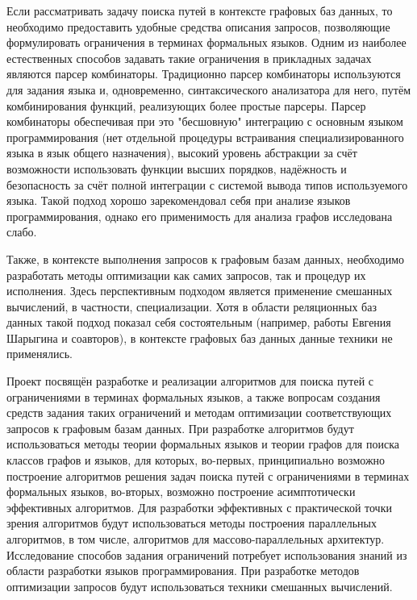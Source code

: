 \documentclass[12pt]{article}  %
\theoremstyle{remark}
\begin{document}
Если рассматривать задачу поиска путей в контексте графовых баз данных, то необходимо предоставить удобные средства описания запросов, позволяющие формулировать ограничения в терминах формальных языков.
Одним из наиболее естественных способов задавать такие ограничения в прикладных задачах являются парсер комбинаторы.
Традиционно парсер комбинаторы используются для задания языка и, одновременно, синтаксического анализатора для него, путём комбинирования функций, реализующих более простые парсеры.
Парсер комбинаторы обеспечивая при это "бесшовную" интеграцию с основным языком программирования (нет отдельной процедуры встраивания специализированного языка в язык общего назначения), высокий уровень абстракции за счёт возможности использовать функции высших порядков, надёжность и безопасность за счёт полной интеграции с системой вывода типов используемого языка.
Такой подход хорошо зарекомендовал себя при анализе языков программирования, однако его применимость для анализа графов исследована слабо.

Также, в контексте выполнения запросов к графовым базам данных, необходимо разработать методы оптимизации как самих запросов, так и процедур их исполнения.
Здесь перспективным подходом является применение смешанных вычислений, в частности, специализации.
Хотя в области реляционных баз данных такой подход показал себя состоятельным (например, работы Евгения Шарыгина и соавторов), в контексте графовых баз данных данные техники не применялись.

Проект посвящён разработке и реализации алгоритмов для поиска путей с ограничениями в терминах формальных языков, а также вопросам создания средств задания таких ограничений и методам оптимизации соответствующих запросов к графовым базам данных.
При разработке алгоритмов будут использоваться методы теории формальных языков и теории графов для поиска классов графов и языков, для которых, во-первых, принципиально возможно построение алгоритмов решения задач поиска путей с ограничениями в терминах формальных языков, во-вторых,  возможно построение асимптотически эффективных алгоритмов.
Для разработки эффективных с практической точки зрения алгоритмов будут использоваться методы построения параллельных алгоритмов, в том числе, алгоритмов для массово-параллельных архитектур.
Исследование способов задания ограничений потребует использования знаний из области разработки языков программирования.
При разработке методов оптимизации запросов будут использоваться техники смешанных вычислений.
\end{document}
